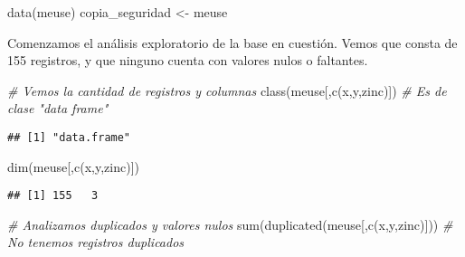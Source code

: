 \documentclass[
  12pt,
]{article}
\newenvironment{Shaded}{\begin{snugshade}}{\end{snugshade}}
\newcommand{\CommentTok}[1]{\textcolor[rgb]{0.56,0.35,0.01}{\textit{#1}}}
\newcommand{\FunctionTok}[1]{\textcolor[rgb]{0.00,0.00,0.00}{#1}}
\newcommand{\NormalTok}[1]{#1}
\newcommand{\OtherTok}[1]{\textcolor[rgb]{0.56,0.35,0.01}{#1}}
\newcommand{\StringTok}[1]{\textcolor[rgb]{0.31,0.60,0.02}{#1}}
\begin{document}
\begin{Shaded}
\begin{Highlighting}[]
\FunctionTok{data}\NormalTok{(meuse)}
\NormalTok{copia\_seguridad }\OtherTok{\textless{}{-}}\NormalTok{ meuse}
\end{Highlighting}
\end{Shaded}

Comenzamos el análisis exploratorio de la base en cuestión. Vemos que
consta de 155 registros, y que ninguno cuenta con valores nulos o
faltantes.

\begin{Shaded}
\begin{Highlighting}[]
\CommentTok{\# Vemos la cantidad de registros y columnas}
\FunctionTok{class}\NormalTok{(meuse[,}\FunctionTok{c}\NormalTok{(}\StringTok{\textquotesingle{}x\textquotesingle{}}\NormalTok{,}\StringTok{\textquotesingle{}y\textquotesingle{}}\NormalTok{,}\StringTok{\textquotesingle{}zinc\textquotesingle{}}\NormalTok{)]) }\CommentTok{\# Es de clase "data frame"}
\end{Highlighting}
\end{Shaded}

\begin{verbatim}
## [1] "data.frame"
\end{verbatim}

\begin{Shaded}
\begin{Highlighting}[]
\FunctionTok{dim}\NormalTok{(meuse[,}\FunctionTok{c}\NormalTok{(}\StringTok{\textquotesingle{}x\textquotesingle{}}\NormalTok{,}\StringTok{\textquotesingle{}y\textquotesingle{}}\NormalTok{,}\StringTok{\textquotesingle{}zinc\textquotesingle{}}\NormalTok{)]) }
\end{Highlighting}
\end{Shaded}

\begin{verbatim}
## [1] 155   3
\end{verbatim}

\begin{Shaded}
\begin{Highlighting}[]
\CommentTok{\# Analizamos duplicados y valores nulos}
\FunctionTok{sum}\NormalTok{(}\FunctionTok{duplicated}\NormalTok{(meuse[,}\FunctionTok{c}\NormalTok{(}\StringTok{\textquotesingle{}x\textquotesingle{}}\NormalTok{,}\StringTok{\textquotesingle{}y\textquotesingle{}}\NormalTok{,}\StringTok{\textquotesingle{}zinc\textquotesingle{}}\NormalTok{)])) }\CommentTok{\# No tenemos registros duplicados}
\end{Highlighting}
\end{Shaded}
\end{document}
